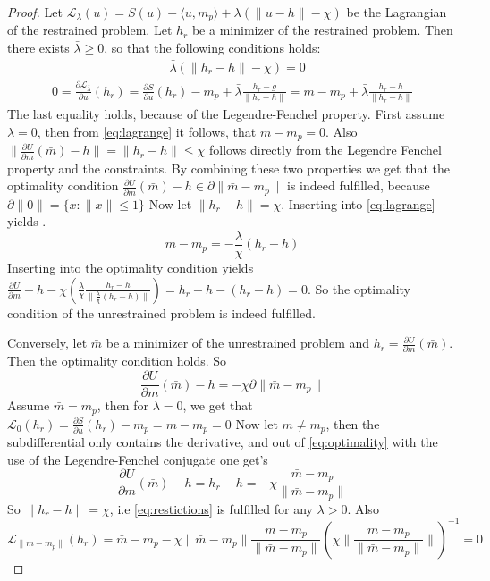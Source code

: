 \documentclass[12pt]{article}
\begin{document}
\begin{proof}
Let $\mathcal L_\lambda(u) = S(u) - \langle u,m_p \rangle + \lambda(\|u - h\| - \chi)$ be the Lagrangian of the restrained problem. 
Let $h_r$ be a minimizer of the restrained problem. Then there exists $\bar \lambda \geq 0$, so that the following conditions holds:
\begin{align}\label{eq:restictions}
    &\bar \lambda (\|h_r - h\| - \chi) = 0
\end{align}
\begin{align}\label{eq:lagrange}
    0 = \frac{\partial \mathcal L_{\bar \lambda}}{\partial u}(h_r) = \frac{\partial S}{\partial u}(h_r) - m_p + \bar \lambda \frac{h_r - g}{\|h_r - h\|} = m - m_p +\bar \lambda\frac{h_r -  h}{\|h_r - h\|}
\end{align}
The last equality holds, because of the Legendre-Fenchel property. 
First assume $\lambda = 0$, then from \eqref{eq:lagrange} it follows, that $m-m_p = 0$. Also $\|\frac{\partial U}{\partial m}(\bar m) - h\| =\|h_r - h\| \leq \chi$ follows directly from the Legendre Fenchel property and the constraints. By combining these two properties we get that the optimality condition $\frac{\partial U}{\partial m}(\bar m) - h \in \partial \|\bar m - m_p\|$ is indeed fulfilled, because $\partial \|0\| = \{x \colon \|x\| \leq 1\}$
Now let $\|h_r - h\| = \chi$. Inserting into \eqref{eq:lagrange} yields .$$m - m_p = - \frac{\lambda}{\chi}(h_r - h)$$
Inserting into the optimality condition yields $\frac{\partial U}{\partial m} - h - \chi (\frac{\lambda}{\chi} \frac{h_r - h}{\|\frac{\lambda}{\chi} (h_r - h) \|}) = h_r  - h - (h_r - h) = 0$. So the optimality condition of the unrestrained problem is indeed fulfilled.

Conversely, let $\bar m$ be a minimizer of the unrestrained problem and $h_r = \frac{\partial U}{\partial m}(\bar m)$. Then the optimality condition holds. So \begin{equation}\label{eq:optimality}
    \frac{\partial U}{\partial m}(\bar m) - h = - \chi \partial\|\bar m - m_p\|
\end{equation}
Assume $\bar m = m_p$, then for $\lambda = 0$, we get that $\mathcal L_0(h_r) = \frac{\partial S}{\partial u}(h_r) - m_p = m - m_p = 0$
Now let $m \neq m_p$, then the subdifferential only contains the derivative, and out of \eqref{eq:optimality} with the use of the Legendre-Fenchel conjugate one get's \begin{equation}
   \frac{\partial U}{\partial m}(\bar m) - h = h_r - h = - \chi \frac{\bar m - m_p}{\|\bar m - m_p\|}
\end{equation}
So $\|h_r - h\| = \chi$, i.e \eqref{eq:restictions} is fulfilled for any $\lambda > 0$.  Also $$\mathcal L_{\|m - m_p\|}(h_r) =\bar m - m_p - \chi \|\bar m - m_p\|\frac{\bar m - m_p}{\|\bar m - m_p\|} (\chi \|\frac{\bar m - m_p}{\|\bar m - m_p\|}\|)^{-1} = 0$$
\end{proof}

\printbibliography
\end{document}
